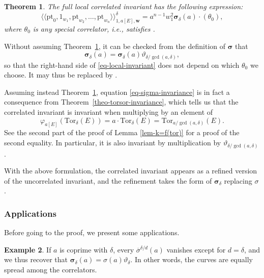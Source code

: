 \documentclass[11pt]{article}
\numberwithin{equation}{section}
\newcommand{\Tor}{\mathrm{Tor}}
\newcommand{\pt}{\mathrm{pt}}
\newcommand{\bfw}{ {\boldsymbol w} }
\newcommand{\dfk}{\mathfrak{d}}
\numberwithin{equation}{section}
\newtheorem{theo}{Theorem}[section]
\theoremstyle{definition}
\newtheorem{expl}[theo]{Example}
\begin{document}
\begin{theo}\label{theo-expression-local-correlated-invariant}
The full local correlated invariant has the following expression:
\begin{equation}\label{eq-local-invariant}
\langle\langle \pt_0,1_{w_1},\pt_{w_2},\dots,\pt_{w_n}\rangle\rangle^\delta_{1,a[E],\bfw} = a^{n-1}w_1^2 \boldsymbol{\sigma}_\delta(a)
\cdot (\theta_0),
\end{equation}
where $\theta_0$ is any special correlator, i.e., satisfies .
\end{theo}

Without assuming Theorem~\ref{theo-expression-local-correlated-invariant}, it can be checked from the definition of $\boldsymbol{\sigma}$ that
\begin{equation}\label{eq-sigma-invariance}
 \boldsymbol{\sigma}_\delta(a) = \boldsymbol{\sigma}_\delta(a)\vartheta_{\delta/\gcd(a,\delta)},
\end{equation}
so that the right-hand side of \eqref{eq-local-invariant} does not depend on which $\theta_0$ we choose. It may thus be replaced by \smash{$\vartheta_{\delta/\gcd(a,\delta)}\cdot(\theta_0)=\dfk\big[\frac{1}{\delta/\gcd(a,\delta)}\big]\bigl(\frac{a}{\gcd(a,\delta)}\lambda\bigr)$}.

Assuming instead Theorem~\ref{theo-expression-local-correlated-invariant}, equation \eqref{eq-sigma-invariance} is in fact a consequence from Theorem~\ref{theo-torsor-invariance}, which tells us that the correlated invariant is invariant when multiplying by an element of \[\varphi_{a[E]}(\Tor_\delta(E))=a\cdot\Tor_\delta(E)=\Tor_{a/\gcd(a,\delta)}(E).\]
See the second part of the proof of Lemma \ref{lem-k=f(tor)} for a proof of the second equality. In particular, it is also invariant by multiplication by $\vartheta_{\delta/\gcd(a,\delta)}$.

With the above formulation, the correlated invariant appears as a refined version of the uncorrelated invariant, and the refinement takes the form of $\boldsymbol{\sigma}_\delta$ replacing $\sigma$.


\subsubsection{Applications} Before going to the proof, we present some applications.

\begin{expl}
 If $a$ is coprime with $\delta$, every $\overline{\sigma}^{\delta/d}(a)$ vanishes except for $d=\delta$, and we thus recover that
$\boldsymbol{\sigma}_\delta(a) = \sigma(a)\vartheta_\delta$.
 In other words, the curves are equally spread among the correlators.
\end{expl}
\end{document}
